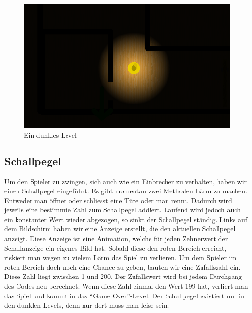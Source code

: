 \documentclass[11pt,a4paper]{scrbook}
\newcommand{\q}[1]{``#1''}
\begin{document}
\begin{figure}[h]     
\centering     
\includegraphics[scale=0.5]{img/dunkel.png}     
\caption{Ein dunkles Level}     
\end{figure}         
    
\subsection{Schallpegel}
\label{Schall}      
Um den Spieler zu zwingen, sich auch wie ein Einbrecher zu verhalten, haben wir einen Schallpegel eingeführt. Es gibt momentan zwei Methoden Lärm zu machen.
Entweder man öffnet oder schliesst eine Türe oder man rennt. 
Dadurch wird jeweils eine bestimmte Zahl zum Schallpegel addiert.
Laufend wird jedoch auch ein konstanter Wert wieder abgezogen, so sinkt der Schallpegel ständig.
Links auf dem Bildschirm haben wir eine Anzeige erstellt, die den aktuellen Schallpegel anzeigt.
Diese Anzeige ist eine Animation, welche für jeden Zehnerwert der Schallanzeige ein eigenes Bild hat.
Sobald diese den roten Bereich erreicht, riskiert man wegen zu vielem Lärm das Spiel zu verlieren.
Um dem Spieler im roten Bereich doch noch eine Chance zu geben, bauten wir eine Zufallszahl ein.
Diese Zahl liegt zwischen 1 und 200. 
Der Zufallswert wird bei jedem Durchgang des Codes neu berechnet.
Wenn diese Zahl einmal den Wert 199 hat, verliert man das Spiel und kommt in das \q{Game Over}-Level.
Der Schallpegel existiert nur in den dunklen Levels, denn nur dort muss man leise sein.
\end{document}
